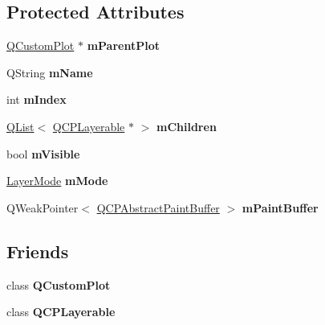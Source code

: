 \subsection*{Protected Attributes}
\begin{DoxyCompactItemize}
\item 
\hyperlink{class_q_custom_plot}{Q\+Custom\+Plot} $\ast$ {\bfseries m\+Parent\+Plot}\hypertarget{class_q_c_p_layer_a7de89b11e56522c19439b4666194d3c4}{}\label{class_q_c_p_layer_a7de89b11e56522c19439b4666194d3c4}

\item 
Q\+String {\bfseries m\+Name}\hypertarget{class_q_c_p_layer_a91e6298183cb4b9dfd4efdfaf1ecc220}{}\label{class_q_c_p_layer_a91e6298183cb4b9dfd4efdfaf1ecc220}

\item 
int {\bfseries m\+Index}\hypertarget{class_q_c_p_layer_a122088bcab6cec76a52b75ce8606605b}{}\label{class_q_c_p_layer_a122088bcab6cec76a52b75ce8606605b}

\item 
\hyperlink{class_q_list}{Q\+List}$<$ \hyperlink{class_q_c_p_layerable}{Q\+C\+P\+Layerable} $\ast$ $>$ {\bfseries m\+Children}\hypertarget{class_q_c_p_layer_a0b32189cc98d488d6649731e9c2a6089}{}\label{class_q_c_p_layer_a0b32189cc98d488d6649731e9c2a6089}

\item 
bool {\bfseries m\+Visible}\hypertarget{class_q_c_p_layer_a264950deb08e589460c126c895a1e2b5}{}\label{class_q_c_p_layer_a264950deb08e589460c126c895a1e2b5}

\item 
\hyperlink{class_q_c_p_layer_a67dcfc1590be2a1f2227c5a39bb59c7c}{Layer\+Mode} {\bfseries m\+Mode}\hypertarget{class_q_c_p_layer_a11bd0aa190d8fa21c8c7673d070737c8}{}\label{class_q_c_p_layer_a11bd0aa190d8fa21c8c7673d070737c8}

\item 
Q\+Weak\+Pointer$<$ \hyperlink{class_q_c_p_abstract_paint_buffer}{Q\+C\+P\+Abstract\+Paint\+Buffer} $>$ {\bfseries m\+Paint\+Buffer}\hypertarget{class_q_c_p_layer_aa99de922c03144a50f7bf280095c8b4f}{}\label{class_q_c_p_layer_aa99de922c03144a50f7bf280095c8b4f}

\end{DoxyCompactItemize}
\subsection*{Friends}
\begin{DoxyCompactItemize}
\item 
class {\bfseries Q\+Custom\+Plot}\hypertarget{class_q_c_p_layer_a00f8b42d059625f815808a7cc99c2f04}{}\label{class_q_c_p_layer_a00f8b42d059625f815808a7cc99c2f04}

\item 
class {\bfseries Q\+C\+P\+Layerable}\hypertarget{class_q_c_p_layer_a1fd64e85b6acdaf9c09c904817e2162c}{}\label{class_q_c_p_layer_a1fd64e85b6acdaf9c09c904817e2162c}

\end{DoxyCompactItemize}


